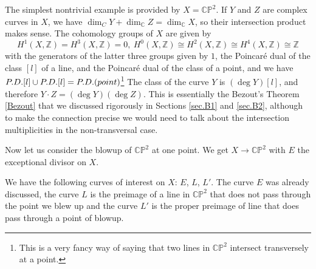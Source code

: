 \documentclass[11pt]{article}
\numberwithin{equation}{section}
\numberwithin{footnote}{section}
\newcommand{\blue}{\color{blue}}
\renewcommand{\P}{{\mathbb P}}
\newcommand{\Z}{{\mathbb Z}}
\newcommand{\C}{{\mathbb C}}
\begin{document}
\smallskip{\blue \hrule}
The simplest nontrivial example is provided by $X=\C\P^2$. If $Y$ and $Z$ are complex curves in $X$, we have $\dim _CY+ \dim_\C Z = \dim_\C X$, so their intersection product makes sense. The cohomology groups of $X$ are given by
$$
H^{1}(X,\Z) = H^{3}(X,\Z) = 0,~ H^{0}(X,\Z)\cong H^2(X,\Z)\cong H^4(X,\Z)  \cong \Z
$$
with the generators of the latter three groups given by $1$, the Poincar\'e dual of the class $[l]$ of a line, and the Poincar\'e dual of the class of a point, and we have ${\rm P.D.}[l]\cup {\rm P.D.}[l] = {\rm P.D.(point)}$\footnote{ This is a very fancy way of saying that two lines in $\C\P^2$ intersect transversely at a point.}
The class of the curve $Y$ is $(\deg Y)[l]$, and therefore $Y\cdot Z = (\deg Y) (\deg Z)$. This is essentially the 
Bezout's Theorem \ref{Bezout} that we discussed rigorously in Sections \ref{sec.B1} and \ref{sec.B2},  although to make the connection precise we would need to talk about the intersection multiplicities in the non-transversal case.


\smallskip
Now let us consider the blowup of $\C\P^2$ at one point. We get $X\to \C\P^2$ with $E$ the exceptional divisor on $X$.


We have the following curves of interest on $X$: $E$, $L$, $L'$. The curve $E$ was already discussed, the curve $L$ is the preimage of a line in $\C\P^2$ that does not pass through the point we blew up and the curve $L'$ is the proper preimage of line that does pass through a point of blowup.
\end{document}
